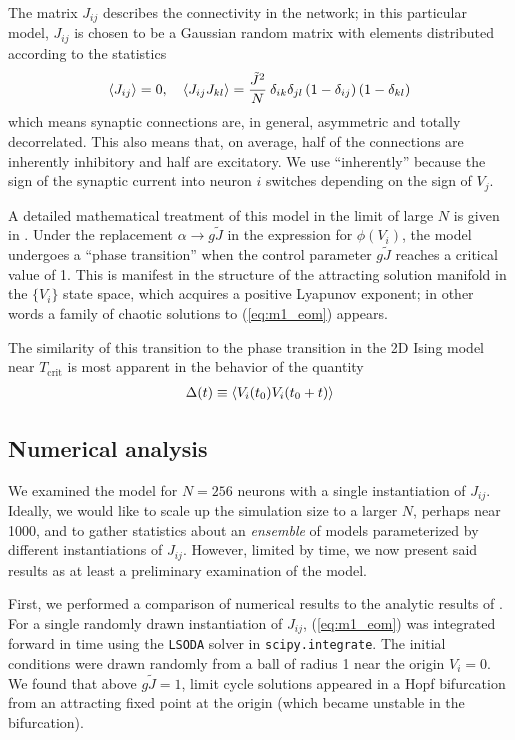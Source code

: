 \documentclass{article} %
\begin{document}
The matrix $J_{ij}$ describes the connectivity in the network; in this particular model, $J_{ij}$ is chosen to be a Gaussian random matrix with elements distributed according to the statistics
\begin{align}
	\left\langle J_{ij} \right\rangle = 0, \quad \left\langle J_{ij}J_{kl} \right\rangle = \frac{\tilde{J}^2}{N} \: \delta_{ik}\delta_{jl} \left(1 - \delta_{ij}\right) \left(1 - \delta_{kl}\right) \label{eq:m1_stats}
\end{align}
which means synaptic connections are, in general, asymmetric and totally decorrelated.  This also means that, on average, half of the connections are inherently inhibitory and half are excitatory.  We use ``inherently'' because the sign of the synaptic current into neuron $i$ switches depending on the sign of $V_j$.

A detailed mathematical treatment of this model in the limit of large $N$ is given in \cite{Sompolinsky1988}.  Under the replacement $\alpha \rightarrow g\tilde{J}$ in the expression for $\phi(V_i)$, the model undergoes a ``phase transition'' when the control parameter $g\tilde{J}$ reaches a critical value of 1.  This is manifest in the structure of the attracting solution manifold in the $\{V_i\}$ state space, which acquires a positive Lyapunov exponent; in other words a family of chaotic solutions to (\ref{eq:m1_eom}) appears.

The similarity of this transition to the phase transition in the 2D Ising model near $T_\text{crit}$ is most apparent in the behavior of the quantity
\begin{align}
	\Delta(t) \equiv \left\langle V_i(t_0) V_i(t_0 + t) \right\rangle \label{eq:m1_Cteq}
\end{align}

\subsection{Numerical analysis}
We examined the model for $N=256$ neurons with a single instantiation of $J_{ij}$.  Ideally, we would like to scale up the simulation size to a larger $N$, perhaps near 1000, and to gather statistics about an \emph{ensemble} of models parameterized by different instantiations of $J_{ij}$.  However, limited by time, we now present said results as at least a preliminary examination of the model.

First, we performed a comparison of numerical results to the analytic results of \cite{Sompolinsky1988}.  For a single randomly drawn instantiation of $J_{ij}$, (\ref{eq:m1_eom}) was integrated forward in time using the \texttt{LSODA} solver in \texttt{scipy.integrate}.  The initial conditions were drawn randomly from a ball of radius 1 near the origin $V_i=0$.  We found that above $g\tilde{J}=1$, limit cycle solutions appeared in a Hopf bifurcation from an attracting fixed point at the origin (which became unstable in the bifurcation).




\end{document}
